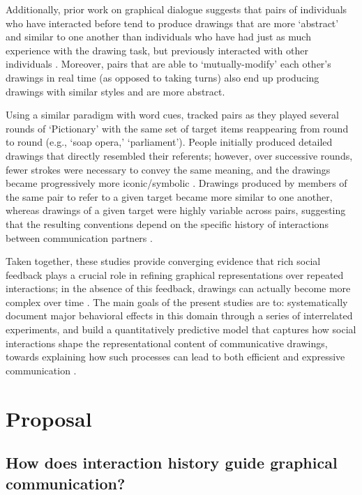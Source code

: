 \documentclass[12pt]{article}
\begin{document}
Additionally, prior work on graphical dialogue suggests that pairs of individuals who have interacted before tend to produce drawings that are more `abstract' and similar to one another than individuals who have had just as much experience with the drawing task, but previously interacted with other individuals \cite{Healey:2007vq}. Moreover, pairs that are able to `mutually-modify' each other's drawings in real time (as opposed to taking turns) also end up producing drawings with similar styles and are more abstract.  

Using a similar paradigm with word cues, \cite{Fay:2010jh} tracked pairs as they played several rounds of `Pictionary' with the same set of target items reappearing from round to round (e.g., `soap opera,' `parliament'). People initially produced detailed drawings that directly resembled their referents; however, over successive rounds, fewer strokes were necessary to convey the same meaning, and the drawings became progressively more iconic/symbolic \cite{Garrod:2007wk}. Drawings produced by members of the same pair to refer to a given target became more similar to one another, whereas drawings of a given target were highly variable across pairs, suggesting that the resulting conventions depend on the specific history of interactions between communication partners \cite{Fay:2010jh}.

Taken together, these studies provide converging evidence that rich social feedback plays a crucial role in refining graphical representations over repeated interactions; in the absence of this feedback, drawings can actually become more complex over time \cite{Garrod:2007wk,Hupet:1992ua}. The main goals of the present studies are to: systematically document major behavioral effects in this domain through a series of interrelated experiments, and build a quantitatively predictive model that captures how social interactions shape the representational content of communicative drawings, towards explaining how such processes can lead to both efficient and expressive communication \cite{Kirby:2015gi}. 

\section{Proposal}

\subsection{How does interaction history guide graphical communication?}
\end{document}

